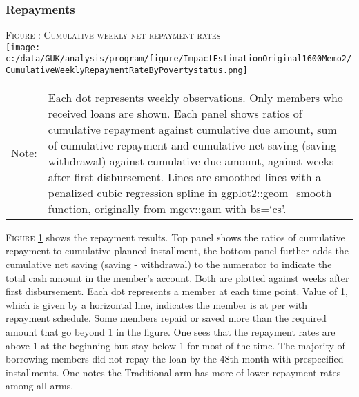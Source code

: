 \subsubsection{Repayments}

\begin{table}
\hfil\textsc{\footnotesize Figure \thefigure: Cumulative weekly net repayment rates\label{fig weeklysavingrepayrate}}\\
\hfil\texttt{[image: c:/data/GUK/analysis/program/figure/ImpactEstimationOriginal1600Memo2/CumulativeWeeklyRepaymentRateByPovertystatus.png]}\\
\renewcommand{\arraystretch}{1}
\hfil\begin{tabular}{>{\hfill\scriptsize}p{1cm}<{}>{\scriptsize}p{12cm}<{\hfill}}
Note:& Each dot represents weekly observations. Only members who received loans are shown. Each panel shows ratios of cumulative repayment against cumulative due amount, sum of cumulative repayment and cumulative net saving (saving - withdrawal) against cumulative due amount, against weeks after first disbursement. Lines are smoothed lines with a penalized cubic regression spline in \textsf{ggplot2::geom\_smooth} function, originally from \textsf{mgcv::gam} with \textsf{bs=`cs'}. \\[-1ex]
\end{tabular}
\end{table}



	\textsc{\footnotesize Figure \ref{fig weeklysavingrepayrate}} shows the repayment results. Top panel shows the ratios of cumulative repayment to cumulative planned installment, the bottom panel further adds the cumulative net saving (saving - withdrawal) to the numerator to indicate the total cash amount in the member's account. Both are plotted against weeks after first disbursement. Each dot represents a member at each time point. Value of 1, which is given by a horizontal line, indicates the member is at per with repayment schedule. Some members repaid or saved more than the required amount that go beyond 1 in the figure. One sees that the repayment rates are above 1 at the beginning but stay below 1 for most of the time. The majority of borrowing members did not repay the loan by the 48th month with prespecified installments. One notes the \textsf{Traditional} arm has more of lower repayment rates among all arms. 
	
